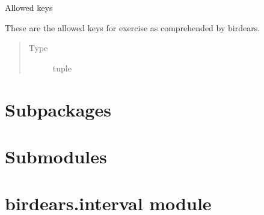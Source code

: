 \documentclass[letterpaper,10pt,english]{sphinxmanual}
\begin{document}

\begin{fulllineitems}
\label{\detokenize{index:birdears.KEYS}}
\sphinxAtStartPar
Allowed keys

\sphinxAtStartPar
These are the allowed keys for exercise as comprehended by birdears.
\begin{quote}\begin{description}
\item[{Type}] \leavevmode
\sphinxAtStartPar
tuple

\end{description}\end{quote}

\end{fulllineitems}



\section{Subpackages}
\label{\detokenize{index:subpackages}}

\section{Submodules}
\label{\detokenize{index:submodules}}

\section{birdears.interval module}
\label{\detokenize{index:module-birdears.interval}}\label{\detokenize{index:birdears-interval-module}}
\end{document}
